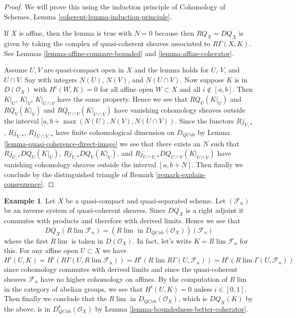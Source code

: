 \documentclass{stacks-project}
\theoremstyle{plain}
\theoremstyle{definition}
\newtheorem{example}[subsection]{Example}
\theoremstyle{remark}
\numberwithin{equation}{subsection}
\def\lim{\mathop{\mathrm{lim}}\nolimits}
\def\QCoh{\mathit{QCoh}}
\begin{document}
\begin{proof}
We will prove this using the induction principle of
Cohomology of Schemes, Lemma \ref{coherent-lemma-induction-principle}.

\medskip\noindent
If $X$ is affine, then the lemma is true with $N = 0$ because then
$RQ_X = DQ_X$ is given by taking the complex of
quasi-coherent sheaves associated to $R\Gamma(X, K)$.
See Lemmas \ref{lemma-affine-compare-bounded} and \ref{lemma-affine-coherator}.

\medskip\noindent
Assume $U, V$ are quasi-compact open in $X$
and the lemma holds for $U$, $V$, and $U \cap V$.
Say with integers $N(U)$, $N(V)$, and $N(U \cap V)$.
Now suppose $K$ is in $D(\mathcal{O}_X)$ with
$H^i(W, K) = 0$ for all affine open $W \subset X$ and all $i \not \in [a, b]$.
Then $K|_U$, $K|_V$, $K|_{U \cap V}$ have the same property.
Hence we see that $RQ_U(K|_U)$ and $RQ_V(K|_V)$ and
$RQ_{U \cap V}(K|_{U \cap V})$ have vanishing cohomology
sheaves outside the interval $[a, b + \max(N(U), N(V), N(U \cap V))$.
Since the functors $Rj_{U, *}$, $Rj_{V, *}$, $Rj_{U \cap V, *}$
have finite cohomological dimension on $D_\QCoh$ by
Lemma \ref{lemma-quasi-coherence-direct-image}
we see that there exists an $N$ such that
$Rj_{U, *}DQ_U(K|_U)$, $Rj_{V, *}DQ_V(K|_V)$, and
$Rj_{U \cap V, *}DQ_{U \cap V}(K|_{U \cap V})$ have vanishing
cohomology sheaves outside the interval $[a, b + N]$.
Then finally we conclude by the distinguished triangle
of Remark \ref{remark-explain-consequence}.
\end{proof}

\begin{example}
\label{example-inverse-limit-quasi-coherent}
Let $X$ be a quasi-compact and quasi-separated scheme. Let $(\mathcal{F}_n)$
be an inverse system of quasi-coherent sheaves. Since $DQ_X$ is a right
adjoint it commutes with products and therefore with derived limits.
Hence we see that
$$
DQ_X(R\lim \mathcal{F}_n) =
(R\lim\text{ in }D_\QCoh(\mathcal{O}_X))(\mathcal{F}_n)
$$
where the first $R\lim$ is taken in $D(\mathcal{O}_X)$.
In fact, let's write $K = R\lim \mathcal{F}_n$ for this.
For any affine open $U \subset X$ we have
$$
H^i(U, K) =
H^i(R\Gamma(U, R\lim \mathcal{F}_n)) =
H^i(R\lim R\Gamma(U, \mathcal{F}_n)) =
H^i(R\lim \Gamma(U, \mathcal{F}_n))
$$
since cohomology commutes with derived limits and since
the quasi-coherent sheaves
$\mathcal{F}_n$ have no higher cohomology on affines.
By the computation of $R\lim$ in the category of
abelian groups, we see that $H^i(U, K) = 0$
unless $i \in [0, 1]$. Then finally we conclude that
the $R\lim$ in $D_\QCoh(\mathcal{O}_X)$, which is
$DQ_X(K)$ by the above, is in $D^b_\QCoh(\mathcal{O}_X)$
by Lemma \ref{lemma-boundedness-better-coherator}.
\end{example}
\end{document}
